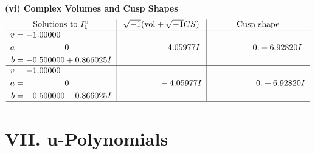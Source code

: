 \documentclass[1p]{elsarticle_modified}
\theoremstyle{definition}
\newcommand{\I}{\sqrt{-1}}
\begin{document}
\newpage\flushleft \textbf{(vi) Complex Volumes and Cusp Shapes}
$$\begin{array}{c|c|c}  
\text{Solutions to }I^v_{1}& \I (\text{vol} + \sqrt{-1}CS) & \text{Cusp shape}\\
 \hline 
\begin{aligned}
v &= -1.00000\phantom{ +0.000000I} \\
a &= \phantom{-0.000000 } 0 \\
b &= -0.500000 + 0.866025 I\end{aligned}
 & \phantom{-0.000000 -}4.05977 I & \phantom{-0.000000 } 0. - 6.92820 I \\ \hline\begin{aligned}
v &= -1.00000\phantom{ +0.000000I} \\
a &= \phantom{-0.000000 } 0 \\
b &= -0.500000 - 0.866025 I\end{aligned}
 & \phantom{-0.000000 } -4.05977 I & \phantom{-0.000000 -}0. + 6.92820 I\\
 \hline 
 \end{array}$$\newpage
\newpage\renewcommand{\arraystretch}{1}
\centering \section*{ VII. u-Polynomials}
\end{document}
